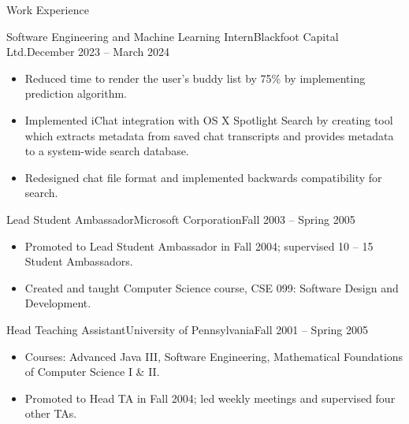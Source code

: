 \documentclass[]{mcdowellcv}
\begin{document}
	\begin{cvsection}{Work Experience}
		\begin{cvsubsection}{Software Engineering and Machine Learning Intern}{Blackfoot Capital Ltd.}{December 2023 -- March 2024}			
			\begin{itemize}
				\item Reduced time to render the user’s buddy list by 75\% by implementing prediction algorithm.
				\item Implemented iChat integration with OS X Spotlight Search by creating tool which extracts metadata from saved chat transcripts and provides metadata to a system-wide search database.
				\item Redesigned chat file format and implemented backwards compatibility for search.
			\end{itemize}
		\end{cvsubsection}
		
		\begin{cvsubsection}{Lead Student Ambassador}{Microsoft Corporation}{Fall 2003 -- Spring 2005}	
			\begin{itemize}
				\item Promoted to Lead Student Ambassador in Fall 2004; supervised 10 -- 15 Student Ambassadors.
				\item Created and taught Computer Science course, CSE 099: Software Design and Development.
			\end{itemize}
		\end{cvsubsection}
		
		\begin{cvsubsection}{Head Teaching Assistant}{University of Pennsylvania}{Fall 2001 -- Spring 2005}		
			\begin{itemize}
				\item Courses: Advanced Java III, Software Engineering, Mathematical Foundations of Computer Science I \& II.
				\item Promoted to Head TA in Fall 2004; led weekly meetings and supervised four other TAs.
			\end{itemize}
		\end{cvsubsection}
		

\end{cvsection}
\end{document}
